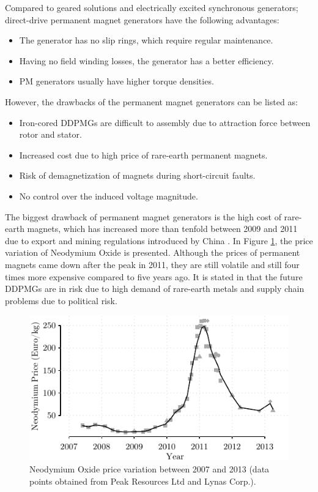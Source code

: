 \documentclass[a4paper, 11pt]{article} %
\begin{document}
Compared to geared solutions and electrically excited synchronous generators; direct-drive permanent magnet generators have the following advantages:

\begin{itemize}
	\item The generator has no slip rings, which require regular maintenance.
	\item Having no field winding losses, the generator has a better efficiency.
	\item PM generators usually have higher torque densities.
\end{itemize}

However, the drawbacks of the permanent magnet generators can be listed as:

\begin{itemize}
	\item Iron-cored DDPMGs are difficult to assembly due to attraction force between rotor and stator.
	\item Increased cost due to high price of rare-earth permanent magnets.
	\item Risk of demagnetization of magnets during short-circuit faults.
	\item No control over the induced voltage magnitude.
\end{itemize}

The biggest drawback of permanent magnet generators is the high cost of rare-earth magnets, which has increased more than tenfold between 2009 and 2011 due to export and mining regulations introduced by China  \cite{rareearthelements}. In Figure \ref{neodymium_price}, the price variation of Neodymium Oxide is presented. Although the prices of permanent magnets came down after the peak in 2011, they are still volatile and still four times more expensive compared to five years ago. It is stated in \cite{Moss2011} that the future DDPMGs are in risk due to high demand of rare-earth metals  and supply chain problems due to political risk.  

\begin{figure}[]
\centering
\includegraphics[]{neodymium_price}
\caption{Neodymium Oxide price variation between 2007 and 2013 (data points obtained from Peak Resources Ltd and Lynas Corp.).}
\label{neodymium_price}
\end{figure}
\end{document}
